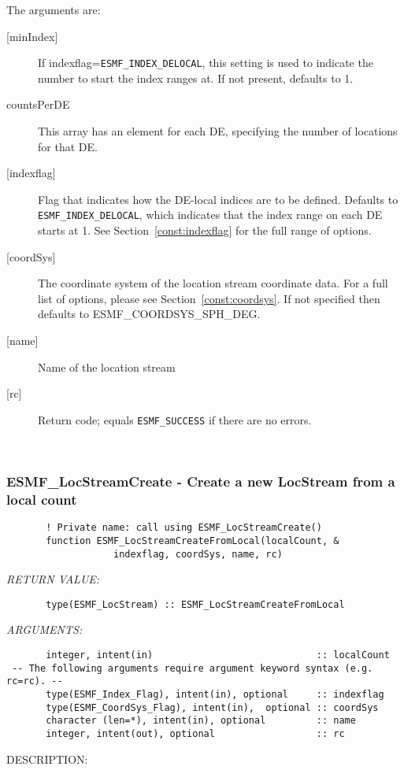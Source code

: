        The arguments are:
       \begin{description}
       \item[{[minIndex]}] 
            If indexflag={\tt ESMF\_INDEX\_DELOCAL}, this setting is used to indicate
            the number to start the index ranges at. If not present, defaults to 1.
       \item[{countsPerDE}] 
            This array has an element for each DE, specifying the number of locations 
            for that DE.
       \item[{[indexflag]}]
            Flag that indicates how the DE-local indices are to be defined.
            Defaults to {\tt ESMF\_INDEX\_DELOCAL}, which indicates
            that the index range on each DE starts at 1. See Section~\ref{const:indexflag}
            for the full range of options. 
       \item[{[coordSys]}]
           The coordinate system of the location stream coordinate data.
           For a full list of options, please see Section~\ref{const:coordsys}.
           If not specified then defaults to ESMF\_COORDSYS\_SPH\_DEG.
       \item[{[name]}]
            Name of the location stream
       \item[{[rc]}]
            Return code; equals {\tt ESMF\_SUCCESS} if there are no errors.
     \end{description}
   
 
\mbox{}\hrulefill\ 
 
\subsubsection [ESMF\_LocStreamCreate] {ESMF\_LocStreamCreate - Create a new LocStream from a local count}


 
\begin{verbatim}       ! Private name: call using ESMF_LocStreamCreate()
       function ESMF_LocStreamCreateFromLocal(localCount, &
                   indexflag, coordSys, name, rc)\end{verbatim}{\em RETURN VALUE:}
\begin{verbatim}       type(ESMF_LocStream) :: ESMF_LocStreamCreateFromLocal
 \end{verbatim}{\em ARGUMENTS:}
\begin{verbatim}       integer, intent(in)                             :: localCount
 -- The following arguments require argument keyword syntax (e.g. rc=rc). --
       type(ESMF_Index_Flag), intent(in), optional     :: indexflag
       type(ESMF_CoordSys_Flag), intent(in),  optional :: coordSys
       character (len=*), intent(in), optional         :: name
       integer, intent(out), optional                  :: rc\end{verbatim}
{\sf DESCRIPTION:\\ }


